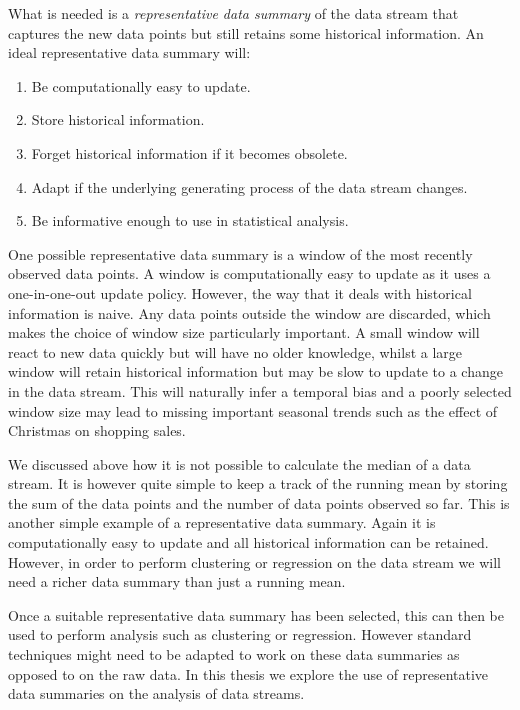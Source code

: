 What is needed is a \textit{representative data summary} of the data stream that captures the new data points but still retains some historical information. An ideal representative data summary will:

\begin{enumerate}
\item Be computationally easy to update.
\item Store historical information.
\item Forget historical information if it becomes obsolete.
\item Adapt if the underlying generating process of the data stream changes.
\item Be informative enough to use in statistical analysis.
\end{enumerate}

One possible representative data summary is a window of the most recently observed data points. A window is computationally easy to update as it uses a one-in-one-out update policy. However, the way that it deals with historical information is naive. Any data points outside the window are discarded, which makes the choice of window size particularly important.  A small window will react to new data quickly but will have no older knowledge, whilst a large window will retain historical information but may be slow to update to a change in the data stream.  This will naturally infer a temporal bias and a poorly selected window size may lead to missing important seasonal trends such as the effect of Christmas on shopping sales. 

We discussed above how it is not possible to calculate the median of a data stream. It is however quite simple to keep a track of the running mean by  storing the sum of the data points and the number of data points observed so far. This is another simple example of a representative data summary.  Again it is computationally easy to update and all historical information can be retained. However, in order to perform clustering or regression on the data stream we will need a richer data summary than just a running mean. 

Once a suitable representative data summary has been selected,  this can then be used to perform analysis such as clustering or regression. However standard techniques might need to be adapted to work on these data summaries as opposed to on the raw data. In this thesis we explore the use of representative data summaries on the analysis of data streams.

